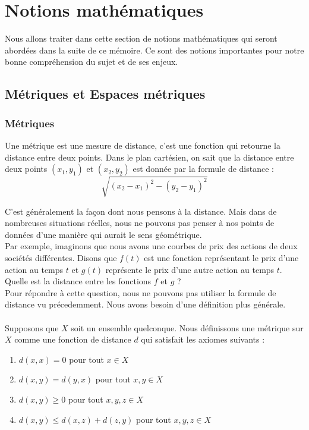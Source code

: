 \chapter{Notions mathématiques}

Nous allons traiter dans cette section de notions mathématiques qui seront abordées dans la suite de ce mémoire. Ce sont des notions importantes pour notre bonne compréhension du sujet et de ses enjeux.

\section{Métriques et Espaces métriques}

\subsection*{Métriques}
Une métrique est une mesure de distance, c'est une fonction qui retourne la distance entre deux points. Dans le plan cartésien, on sait que la distance entre deux points $(x_1, y_1)$ et $(x_2, y_2)$ est donnée par la formule de distance : \\
$$ \sqrt{(x_2 - x_1)^2 - (y_2 -y_1)^2} $$



C'est généralement la façon dont nous pensons à la distance. Mais dans de nombreuses situations réelles, nous ne pouvons pas penser à nos points de données d'une manière qui aurait le sens géométrique.
\\
Par exemple, imaginons que nous avons une courbes de prix des actions de deux sociétés différentes. Disons que $f(t)$ est une fonction représentant le prix d'une action au temps $t$ et $g(t)$ représente le prix d'une autre action au temps $t$. Quelle est la distance entre les fonctions $f$ et $g$ ? 
\\
Pour répondre à cette question, nous ne pouvons pas utiliser la formule de distance vu précedemment. Nous avons besoin d'une définition plus générale. 
\\
\\
Supposons que $X$ soit un ensemble quelconque. Nous définissons une métrique sur $X$ comme une fonction de distance $d$ qui satisfait les axiomes suivants :
\begin{enumerate}
        \item $d(x, x)=0$ pour tout $x \in X$
        \item $d(x, y)=d(y, x)$ pour tout $x,y \in X$
        \item $d(x, y) \geqslant 0$ pour tout $x, y, z \in X$
        \item $d(x, y) \leqslant d(x, z) + d(z, y)$ pour tout $x, y, z \in X$
\end{enumerate}

